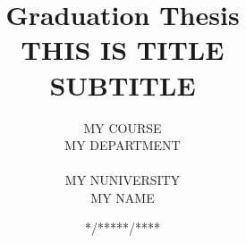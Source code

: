 \documentclass[report,10.5pt,a4paper,oneside,openany,uplatex]{jsbook}
\title{
  \vspace{-30truemm}
  {\Large Graduation Thesis}\\
  \vspace{5truemm}
  \vspace{15truemm}
  {\Huge THIS IS TITLE}\\
  \vspace{3truemm}
  {\Large SUBTITLE}
  \vspace{90truemm}
}
\author{
   {\large MY COURSE} \\
  {\large MY DEPARTMENT}\\ \\
  \vspace{10truemm}
  {\Large MY NUNIVERSITY}\\
  \vspace{10truemm}
  {\LARGE MY NAME}
}
\date{{\Large **/*****/****}}
\renewcommand{\figurename}{Figure }
\renewcommand{\tablename}{Table }
\renewcommand{\lstlistingname}{Code}
\begin{document}
\maketitle              %
\thispagestyle{empty}   %
\setcounter{page}{1}    %
\tableofcontents        %
{%
\let\oldnumberline\numberline%
\renewcommand{\numberline}{\figurename~\oldnumberline}%
\listoffigures%
} 
{%
\let\oldnumberline\numberline%
\renewcommand{\numberline}{\tablename~\oldnumberline}%
\listoftables %
} 
{%
\let\oldnumberline\numberline%
\renewcommand{\numberline}{\lstlistingname~\oldnumberline}%
\lstlistoflistings %
} 
 


\def\thesection{\Alph{section}}
\appendix
\renewcommand{\thefigure}{A.\arabic{figure}}
\renewcommand{\thetable}{A.\arabic{table}}
\setcounter{figure}{0}
\setcounter{table}{0}


\renewcommand{\thefigure}{B.\arabic{figure}}
\renewcommand{\thesubsection}{B.\arabic{subsection}}
\renewcommand{\thetable}{B.\arabic{table}}
\setcounter{figure}{0}
\setcounter{table}{0}



 
\thispagestyle{footerpagenum}


\end{document}
